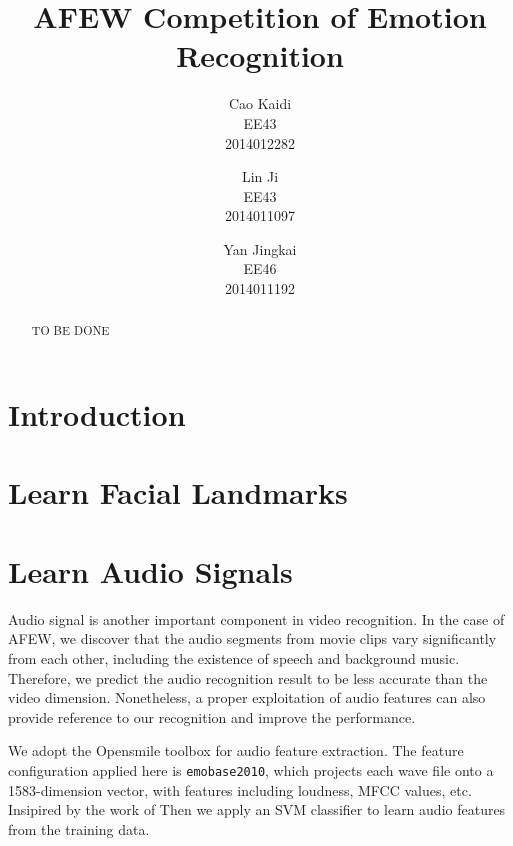 \documentclass[10pt,twocolumn,letterpaper]{article}
\begin{document}
\title{AFEW Competition of Emotion Recognition}

\author{Cao Kaidi\\
EE43\\
2014012282
\and
Lin Ji\\
EE43\\
2014011097
\and
Yan Jingkai\\
EE46\\
2014011192
}

\maketitle

\begin{abstract}
   TO BE DONE
\end{abstract}

\section{Introduction}



\section{Learn Facial Landmarks}



\section{Learn Audio Signals}

Audio signal is another important component in video recognition. In the case of AFEW, we discover that the audio segments from movie clips vary significantly from each other, including the existence of speech and background music. Therefore, we predict the audio recognition result to be less accurate than the video dimension. Nonetheless, a proper exploitation of audio features can also provide reference to our recognition and improve the performance.

We adopt the Opensmile toolbox \cite{eyben2010opensmile} for audio feature extraction. The feature configuration applied here is \texttt{emobase2010}, which projects each wave file onto a 1583-dimension vector, with features including loudness, MFCC values, etc. Insipired by the work of \cite{fan2016video} Then we apply an SVM classifier to learn audio features from the training data.
\end{document}
